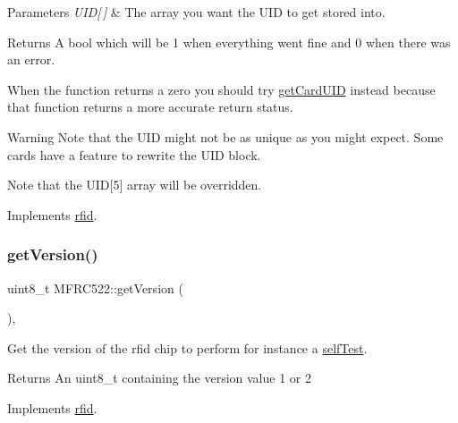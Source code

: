 \begin{DoxyParams}{Parameters}
{\em U\+I\+D\mbox{[}$\,$\mbox{]}} & The array you want the U\+ID to get stored into. \\
\hline
\end{DoxyParams}
\begin{DoxyReturn}{Returns}
A bool which will be 1 when everything went fine and 0 when there was an error.
\end{DoxyReturn}
When the function returns a zero you should try \mbox{\hyperlink{class_m_f_r_c522_ad3c7ab4c70988e80c400f36f724a12b7}{get\+Card\+U\+ID}} instead because that function returns a more accurate return status. \begin{DoxyWarning}{Warning}
Note that the U\+ID might not be as unique as you might expect. Some cards have a feature to rewrite the U\+ID block. 

Note that the U\+ID\mbox{[}5\mbox{]} array will be overridden. 
\end{DoxyWarning}


Implements \mbox{\hyperlink{classrfid_aaeb826495120d8d29683f0ea1b985d77}{rfid}}.

\mbox{\label{class_m_f_r_c522_a25fb0a50bf7db51ab9c5bc2ff4fa84e3}} 
\subsubsection{\texorpdfstring{get\+Version()}{getVersion()}}
{\footnotesize\ttfamily uint8\+\_\+t M\+F\+R\+C522\+::get\+Version (\begin{DoxyParamCaption}{ }\end{DoxyParamCaption})\hspace{0.3cm}{\ttfamily [override]}, {\ttfamily [virtual]}}



Get the version of the rfid chip to perform for instance a \mbox{\hyperlink{class_m_f_r_c522_adcc4f5eb212c1a94e462eab459bd685e}{self\+Test}}. 

\begin{DoxyReturn}{Returns}
An uint8\+\_\+t containing the version value 1 or 2 
\end{DoxyReturn}


Implements \mbox{\hyperlink{classrfid_a27619628e718bb781f912aead770079a}{rfid}}.

\mbox{\label{class_m_f_r_c522_a016df9ed0421397c634cc79c475dbe3b}} 

